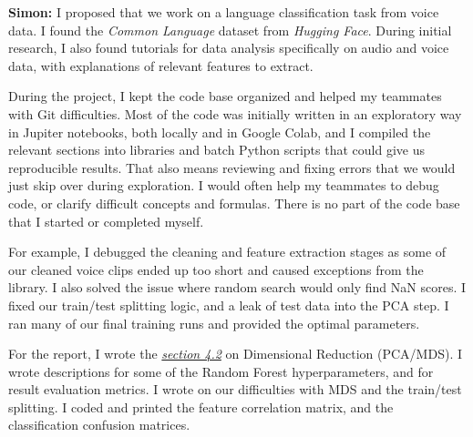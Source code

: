 \documentclass[twocolumn]{article}
\begin{document}
\textbf{Simon:}
I proposed that we work on a language classification task from voice data. I found the \textit{Common Language} dataset from \textit{Hugging Face}. During initial research, I also found tutorials for data analysis specifically on audio and voice data, with explanations of relevant features to extract.

During the project, I kept the code base organized and helped my teammates with Git difficulties. Most of the code was initially written in an exploratory way in Jupiter notebooks, both locally and in Google Colab, and I compiled the relevant sections into libraries and batch Python scripts that could give us reproducible results. That also means reviewing and fixing errors that we would just skip over during exploration. I would often help my teammates to debug code, or clarify difficult concepts and formulas. There is no part of the code base that I started or completed myself.

For example, I debugged the cleaning and feature extraction stages as some of our cleaned voice clips ended up too short and caused exceptions from the library. I also solved the issue where random search would only find NaN scores. I fixed our train/test splitting logic, and a leak of test data into the PCA step. I ran many of our final training runs and provided the optimal parameters.

For the report, I wrote the \hyperref[4.2]{\textit{section 4.2}} on Dimensional Reduction (PCA/MDS). I wrote descriptions for some of the Random Forest hyperparameters, and for result evaluation metrics. I wrote on our difficulties with MDS and the train/test splitting. I coded and printed the feature correlation matrix, and the classification confusion matrices.
\end{document}
